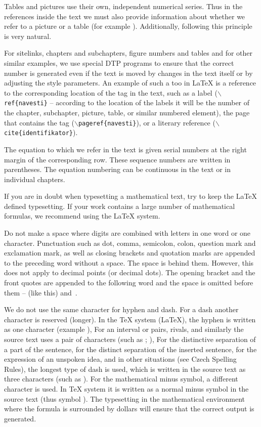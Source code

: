 Tables and pictures use their own, independent numerical series. Thus in the references inside the text we must also provide information about whether we refer to a picture or a table (for example ). Additionally, following this principle is very natural.

For sitelinks, chapters and subchapters, figure numbers and tables and for other similar examples, we use special DTP programs to ensure that the correct number is generated even if the text is moved by changes in the text itself or by adjusting the style parameters. An example of such a too in LaTeX is a reference to the corresponding location of the tag in the text, such as a label ($\backslash${\tt ref\{navesti\}} -- according to the location of the labels it will be the number of the chapter, subchapter, picture, table, or similar numbered element), the page that contains the tag ($\backslash${\tt pageref\{navesti\}}), or a literary reference ($\backslash${\tt cite\{identifikator\}}).

The equation to which we refer in the text is given serial numbers at the right margin of the corresponding row. These sequence numbers are written in parentheses. The equation numbering can be continuous in the text or in individual chapters.

If you are in doubt when typesetting a mathematical text, try to keep the LaTeX defined typesetting. If your work contains a large number of mathematical formulas, we recommend using the LaTeX system.

Do not make a space where digits are combined with letters in one word or one character.
Punctuation such as  dot, comma, semicolon, colon, question mark and exclamation mark, as well as closing brackets and quotation marks are appended to the preceding word without a space. The space is behind them. However, this does not apply to decimal points (or decimal dots). The opening bracket and the front quotes are appended to the following word and the space is omitted before them
 -- (like this) and~.

We do not use the same character for hyphen and dash. For a dash another character is reserved (longer). In the TeX system (LaTeX), the hyphen is written as one character  (example ), For an interval or pairs, rivals, and similarly the source text uses a pair of characters  (such as ; ), For the distinctive separation of a part of the sentence, for the distinct separation of the inserted sentence, for the expression of an unspoken idea, and in other situations (see Czech Spelling Rules), the longest type of dash is used, which is written in the source text as three characters  (such as ). For the mathematical minus symbol, a different character is used. In TeX system it is written as a normal minus symbol in the source text (thus symbol ). The typesetting in the mathematical environment where the formula is surrounded by dollars will ensure that the correct output is generated.

